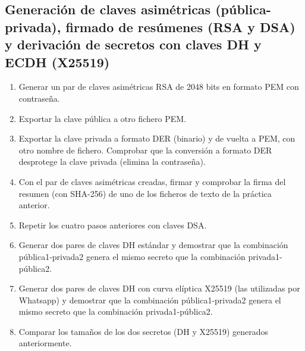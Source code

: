\subsection{Generación de claves asimétricas (pública-privada), firmado de resúmenes
(RSA y DSA) y derivación de secretos con claves DH y ECDH (X25519)}
\begin{enumerate}
    \item Generar un par de claves asimétricas RSA de 2048 bits en formato PEM con contraseña.
    \item Exportar la clave pública a otro fichero PEM.
    \item Exportar la clave privada a formato DER (binario) y de vuelta a PEM, con otro nombre de fichero. Comprobar que la conversión a formato DER desprotege la clave privada (elimina la contraseña).
    \item Con el par de claves asimétricas creadas, firmar y comprobar la firma del resumen (con SHA-256) de uno de los ficheros de texto de la práctica anterior.
    \item Repetir los cuatro pasos anteriores con claves DSA.
    \item Generar dos pares de claves DH estándar y demostrar que la combinación pública1-privada2 genera el mismo secreto que la combinación privada1-pública2.
    \item Generar dos pares de claves DH con curva elíptica X25519 (las utilizadas por Whatsapp) y demostrar que la combinación pública1-privada2 genera el mismo secreto que la combinación privada1-pública2.
    \item Comparar los tamaños de los dos secretos (DH y X25519) generados anteriormente.
\end{enumerate}

